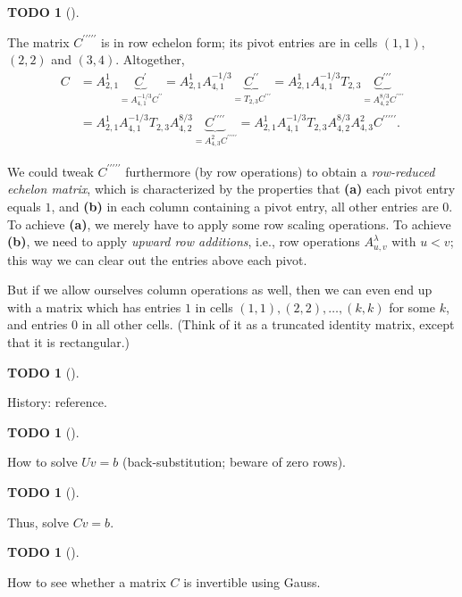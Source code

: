 \documentclass[numbers=enddot,12pt,final,onecolumn,notitlepage]{scrartcl}%
\theoremstyle{definition}
\newtheorem{quest}[theo]{TODO}
\newenvironment{todo}[1][]
{\begin{quest}[#1]\begin{leftbar}}
{\end{leftbar}\end{quest}}
\begin{document}
\begin{todo}
The matrix $C^{\prime\prime\prime\prime\prime}$ is in row echelon form; its
pivot entries are in cells $\left(  1,1\right)  $, $\left(  2,2\right)  $ and
$\left(  3,4\right)  $. Altogether,%
\begin{align*}
C  &  =A_{2,1}^{1}\underbrace{C^{\prime}}_{=A_{4,1}^{-1/3}C^{\prime\prime}%
}=A_{2,1}^{1}A_{4,1}^{-1/3}\underbrace{C^{\prime\prime}}_{=T_{2,3}%
C^{\prime\prime\prime}}=A_{2,1}^{1}A_{4,1}^{-1/3}T_{2,3}\underbrace{C^{\prime
\prime\prime}}_{=A_{4,2}^{8/3}C^{\prime\prime\prime\prime}}\\
&  =A_{2,1}^{1}A_{4,1}^{-1/3}T_{2,3}A_{4,2}^{8/3}\underbrace{C^{\prime
\prime\prime\prime}}_{=A_{4,3}^{2}C^{\prime\prime\prime\prime\prime}}%
=A_{2,1}^{1}A_{4,1}^{-1/3}T_{2,3}A_{4,2}^{8/3}A_{4,3}^{2}C^{\prime\prime
\prime\prime\prime}.
\end{align*}


We could tweak $C^{\prime\prime\prime\prime\prime}$ furthermore (by row
operations) to obtain a \textit{row-reduced echelon matrix}, which is
characterized by the properties that \textbf{(a)} each pivot entry equals $1$,
and \textbf{(b)} in each column containing a pivot entry, all other entries
are $0$. To achieve \textbf{(a)}, we merely have to apply some row scaling
operations. To achieve \textbf{(b)}, we need to apply \textit{upward row
additions}, i.e., row operations $A_{u,v}^{\lambda}$ with $u<v$; this way we
can clear out the entries above each pivot.

But if we allow ourselves column operations as well, then we can even end up
with a matrix which has entries $1$ in cells $\left(  1,1\right)  ,\left(
2,2\right)  ,\ldots,\left(  k,k\right)  $ for some $k$, and entries $0$ in all
other cells. (Think of it as a truncated identity matrix, except that it is rectangular.)
\end{todo}

\begin{todo}
History: \cite{Grcar10} reference.
\end{todo}

\begin{todo}
How to solve $Uv=b$ (back-substitution; beware of zero rows).
\end{todo}

\begin{todo}
Thus, solve $Cv=b$.
\end{todo}

\begin{todo}
How to see whether a matrix $C$ is invertible using Gauss.
\end{todo}
\end{document}
